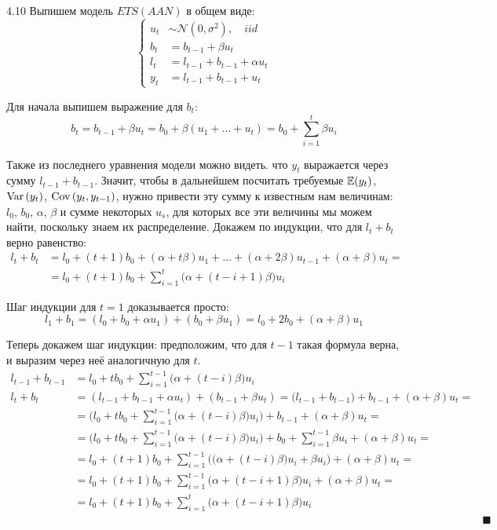 \begin{solution}{{4.10}}
Выпишем модель $ETS(AAN)$ в общем виде:
\[
    \left\{\begin{aligned}
        u_t &\sim \mathcal{N}(0, \sigma^2), \quad iid \\
        b_t &= b_{t-1} + \beta u_t \\
        l_t &= l_{t-1} + b_{t-1} + \alpha u_t \\
        y_t &= l_{t-1} + b_{t-1} + u_t
    \end{aligned}\right.
\]

Для начала выпишем выражение для $b_t$:
\[
    b_t = b_{t-1} + \beta u_t = b_0 + \beta(u_1 + \ldots + u_t) = b_0 + \sum_{i = 1}^t \beta u_i
\]

Также из последнего уравнения модели можно видеть. что $y_t$ выражается через сумму $l_{t-1} + b_{t-1}$. Значит, чтобы в дальнейшем посчитать требуемые $\mathbb{E}{\left(y_t\right)}$, $\operatorname{Var}{\left(y_t\right)}$, $\operatorname{Cov}{\left(y_t, y_{t-1}\right)}$, нужно привести эту сумму к известным нам величинам: $l_0$, $b_0$, $\alpha$, $\beta$ и сумме некоторых $u_s$, для которых все эти величины мы можем найти, поскольку знаем их распределение. Докажем по индукции, что для $l_{t} + b_{t}$ верно равенство:
\begin{align*}
    l_{t} + b_{t} 
    &= l_0 + (t + 1) b_0 + (\alpha + t\beta) u_1 + \ldots + (\alpha + 2\beta) u_{t-1} + (\alpha + \beta) u_t = \\
    &= l_0 + (t + 1) b_0 + \sum_{i = 1}^t \big(\alpha + (t - i + 1)\beta\big) u_i
\end{align*}

Шаг индукции для $t = 1$ доказывается просто:
\[
    l_1 + b_1 = (l_0 + b_0 + \alpha u_1) + (b_0 + \beta u_1) = l_0 + 2 b_0 + (\alpha + \beta) u_1
\]

Теперь докажем шаг индукции: предположим, что для $t - 1$ такая формула верна, и выразим через неё аналогичную для $t$.
\begin{align*}
l_{t-1} + b_{t-1} &= l_0 + t b_0 + \sum_{i = 1}^{t-1} \big(\alpha + (t - i)\beta\big) u_i \\
    l_t + b_t &= (l_{t-1} + b_{t-1} + \alpha u_t) + (b_{t-1} + \beta u_t) = \big(l_{t-1} + b_{t-1}\big) + b_{t-1} + (\alpha + \beta) u_t = \\
    &= \Big( l_0 + t b_0 + \sum_{i = 1}^{t-1} \big(\alpha + (t - i)\beta\big) u_i \Big) + b_{t-1} + (\alpha + \beta) u_t = \\
    &= \Big( l_0 + t b_0 + \sum_{i = 1}^{t-1} \big(\alpha + (t - i)\beta\big) u_i \Big) + b_0 + \sum_{i = 1}^{t-1} \beta u_i + (\alpha + \beta) u_t = \\
    &= l_0 + (t + 1) b_0 + \sum_{i = 1}^{t-1} \Big(\big(\alpha + (t - i)\beta\big) u_i + \beta u_i \Big) + (\alpha + \beta) u_t = \\
    &= l_0 + (t + 1) b_0 + \sum_{i = 1}^{t-1} \big(\alpha + (t - i + 1)\beta\big) u_i + (\alpha + \beta) u_t = \\
    &= l_0 + (t + 1) b_0 + \sum_{i = 1}^{t} \big(\alpha + (t - i + 1)\beta\big) u_i \\
    &&\blacksquare
\end{align*}


\end{solution}
